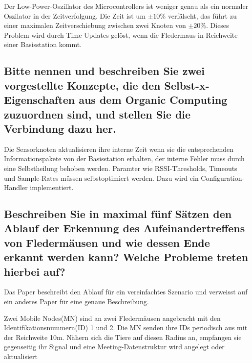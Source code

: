 \documentclass[11pt]{scrartcl}
\begin{document}
Der Low-Power-Oszillator des Microcontrollers ist weniger genau als ein normaler Oszilator in der Zeitverfolgung. Die Zeit ist um $\pm10\%$ verfälscht, das führt zu einer maximalen Zeitverschiebung zwischen zwei Knoten von $\pm20\%$. Dieses Problem wird durch Time-Updates gelöst, wenn die Fledermaus in Reichweite einer Basisstation kommt.

\subsection{Bitte nennen und beschreiben Sie zwei vorgestellte Konzepte, die den Selbst-x-Eigenschaften
aus dem Organic Computing zuzuordnen sind, und stellen Sie die Verbindung dazu her.}

Die Sensorknoten aktualisieren ihre interne Zeit wenn sie die entsprechenden Informationspakete von der Basisstation erhalten, der interne Fehler muss durch eine Selbstheilung behoben werden.
Paramter wie RSSI-Thresholds, Timeouts und Sample-Rates müssen selbstoptimiert werden. Dazu wird ein Configuration-Handler implementiert.
\subsection{Beschreiben Sie in maximal fünf Sätzen den Ablauf der Erkennung des Aufeinandertreffens
von Fledermäusen und wie dessen Ende erkannt werden kann? Welche Probleme treten hierbei
auf?}
Das Paper beschreibt den Ablauf für ein vereinfachtes Szenario und verweisst auf ein anderes Paper für eine genaue Beschreibung.

Zwei Mobile Nodes(MN) sind an zwei Fledermäusen angebracht mit den Identifikationsnummern(ID) 1 und 2. Die MN senden ihre IDs periodisch aus mit der Reichweite 10m. Nähern sich die Tiere auf diesen Radius an, empfangen sie gegenseitig ihr Signal und eine Meeting-Datenstruktur wird angelegt oder aktualisiert
\end{document}
